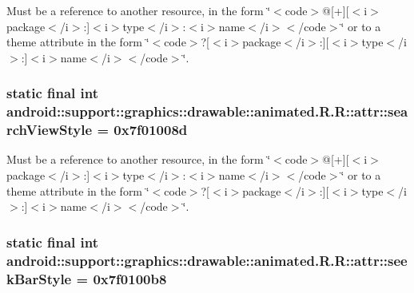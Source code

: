 Must be a reference to another resource, in the form \char`\"{}$<$code$>$@\mbox{[}+\mbox{]}\mbox{[}$<$i$>$package$<$/i$>$:\mbox{]}$<$i$>$type$<$/i$>$:$<$i$>$name$<$/i$>$$<$/code$>$\char`\"{} or to a theme attribute in the form \char`\"{}$<$code$>$?\mbox{[}$<$i$>$package$<$/i$>$:\mbox{]}\mbox{[}$<$i$>$type$<$/i$>$:\mbox{]}$<$i$>$name$<$/i$>$$<$/code$>$\char`\"{}. \hypertarget{classandroid_1_1support_1_1graphics_1_1drawable_1_1animated_1_1_r_1_1attr_215867edcc6899c81b7070d8129cf5d9}{
\subsubsection[{searchViewStyle}]{\setlength{\rightskip}{0pt plus 5cm}static final int android::support::graphics::drawable::animated.R.R::attr::searchViewStyle = 0x7f01008d}}
\label{classandroid_1_1support_1_1graphics_1_1drawable_1_1animated_1_1_r_1_1attr_215867edcc6899c81b7070d8129cf5d9}


Must be a reference to another resource, in the form \char`\"{}$<$code$>$@\mbox{[}+\mbox{]}\mbox{[}$<$i$>$package$<$/i$>$:\mbox{]}$<$i$>$type$<$/i$>$:$<$i$>$name$<$/i$>$$<$/code$>$\char`\"{} or to a theme attribute in the form \char`\"{}$<$code$>$?\mbox{[}$<$i$>$package$<$/i$>$:\mbox{]}\mbox{[}$<$i$>$type$<$/i$>$:\mbox{]}$<$i$>$name$<$/i$>$$<$/code$>$\char`\"{}. \hypertarget{classandroid_1_1support_1_1graphics_1_1drawable_1_1animated_1_1_r_1_1attr_69261a9374803164251186ccab487c91}{
\subsubsection[{seekBarStyle}]{\setlength{\rightskip}{0pt plus 5cm}static final int android::support::graphics::drawable::animated.R.R::attr::seekBarStyle = 0x7f0100b8}}
\label{classandroid_1_1support_1_1graphics_1_1drawable_1_1animated_1_1_r_1_1attr_69261a9374803164251186ccab487c91}



